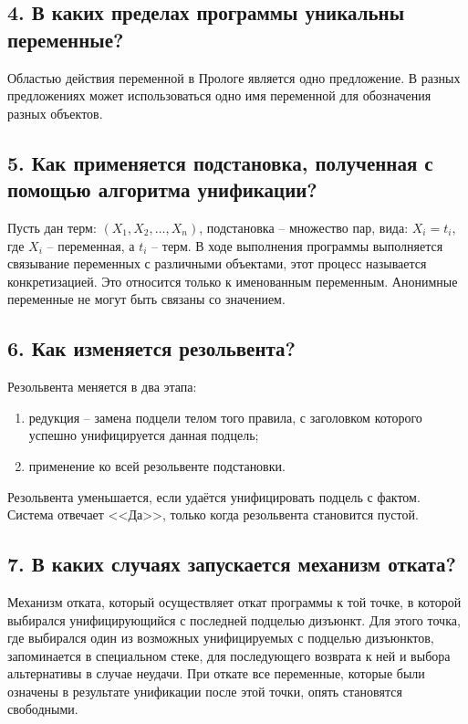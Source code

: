 \subsection*{4. В каких пределах программы уникальны переменные?}

Областью действия переменной в Прологе является одно предложение. В разных предложениях может использоваться одно имя переменной для обозначения разных объектов.

\subsection*{5. Как применяется подстановка, полученная с помощью алгоритма унификации?}

Пусть дан терм: $(X_1, X_2,\dots, X_n)$, подстановка -- множество пар, вида: ${X_i = t_i}$, где $X_i$ -- переменная, а $t_i$ -- терм. В ходе выполнения программы выполняется связывание переменных с различными объектами, этот процесс называется конкретизацией. Это относится только к именованным переменным. Анонимные переменные не могут быть связаны со значением.

\subsection*{6. Как изменяется резольвента?}

Резольвента меняется в два этапа:

\begin{enumerate}
	\item редукция -- замена подцели телом того правила, с заголовком которого успешно унифицируется данная подцель;
	
	\item применение ко всей резольвенте подстановки.
\end{enumerate}

Резольвента уменьшается, если удаётся унифицировать подцель с фактом. Система отвечает <<Да>>, только когда резольвента становится пустой.

\subsection*{7. В каких случаях запускается механизм отката?}

Механизм отката, который осуществляет откат программы к той точке, в которой выбирался унифицирующийся с последней подцелью дизъюнкт. Для этого точка, где выбирался один из возможных унифицируемых с подцелью дизъюнктов, запоминается в специальном стеке, для последующего возврата к ней и выбора альтернативы в случае неудачи. При откате все переменные, которые были означены в результате унификации после этой точки, опять становятся свободными.

